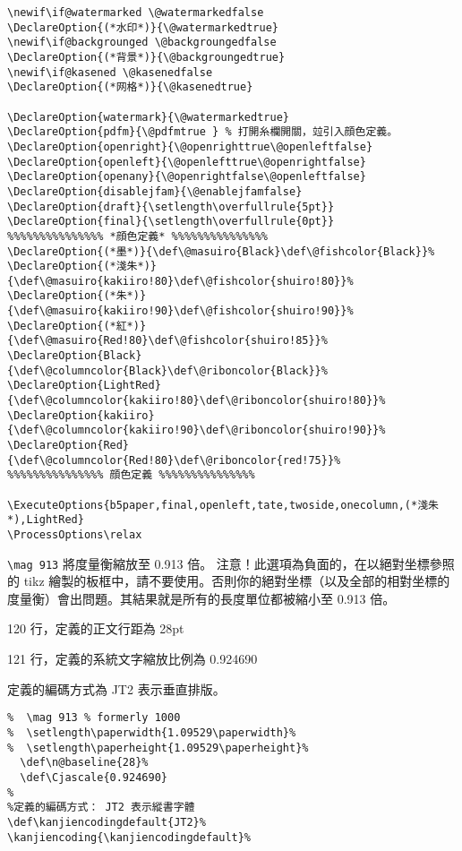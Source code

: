 \begin{lstlisting}[firstnumber=88]
\newif\if@watermarked \@watermarkedfalse
\DeclareOption{(*水印*)}{\@watermarkedtrue}
\newif\if@backgrounged \@backgroungedfalse
\DeclareOption{(*背景*)}{\@backgroungedtrue}
\newif\if@kasened \@kasenedfalse
\DeclareOption{(*网格*)}{\@kasenedtrue}

\DeclareOption{watermark}{\@watermarkedtrue}
\DeclareOption{pdfm}{\@pdfmtrue } % 打開糸欄開關，竝引入顔色定義。
\DeclareOption{openright}{\@openrighttrue\@openleftfalse}
\DeclareOption{openleft}{\@openlefttrue\@openrightfalse}
\DeclareOption{openany}{\@openrightfalse\@openleftfalse}
\DeclareOption{disablejfam}{\@enablejfamfalse}
\DeclareOption{draft}{\setlength\overfullrule{5pt}}
\DeclareOption{final}{\setlength\overfullrule{0pt}}
%%%%%%%%%%%%%%% *顔色定義* %%%%%%%%%%%%%%%
\DeclareOption{(*墨*)}{\def\@masuiro{Black}\def\@fishcolor{Black}}%
\DeclareOption{(*淺朱*)}{\def\@masuiro{kakiiro!80}\def\@fishcolor{shuiro!80}}%
\DeclareOption{(*朱*)}{\def\@masuiro{kakiiro!90}\def\@fishcolor{shuiro!90}}%
\DeclareOption{(*紅*)}{\def\@masuiro{Red!80}\def\@fishcolor{shuiro!85}}%
\DeclareOption{Black}{\def\@columncolor{Black}\def\@riboncolor{Black}}%
\DeclareOption{LightRed}{\def\@columncolor{kakiiro!80}\def\@riboncolor{shuiro!80}}%
\DeclareOption{kakiiro}{\def\@columncolor{kakiiro!90}\def\@riboncolor{shuiro!90}}%
\DeclareOption{Red}{\def\@columncolor{Red!80}\def\@riboncolor{red!75}}%
%%%%%%%%%%%%%%% 顔色定義 %%%%%%%%%%%%%%%

\ExecuteOptions{b5paper,final,openleft,tate,twoside,onecolumn,(*淺朱*),LightRed}
\ProcessOptions\relax
\end{lstlisting}

\par%
\verb+\mag 913+ 將度量衡縮放至 0.913 倍。 
注意！此選項為負面的，在以絕對坐標參照的 tikz 繪製的板框中，請不要使用。否則你的絕對坐標（以及全部的相對坐標的度量衡）會出問題。其結果就是所有的長度單位都被縮小至 0.913 倍。
\par%
120 行，定義的正文行距為 28pt
\par%
121 行，定義的系統文字縮放比例為 0.924690
\par%
定義的編碼方式為 JT2 表示垂直排版。

\begin{lstlisting}[firstnumber=116]
% 版面縮放至 0.913 倍
%  \mag 913 % formerly 1000
%  \setlength\paperwidth{1.09529\paperwidth}%
%  \setlength\paperheight{1.09529\paperheight}%
  \def\n@baseline{28}%
  \def\Cjascale{0.924690}
%
%定義的編碼方式： JT2 表示縱書字體
\def\kanjiencodingdefault{JT2}%
\kanjiencoding{\kanjiencodingdefault}%
\end{lstlisting}

